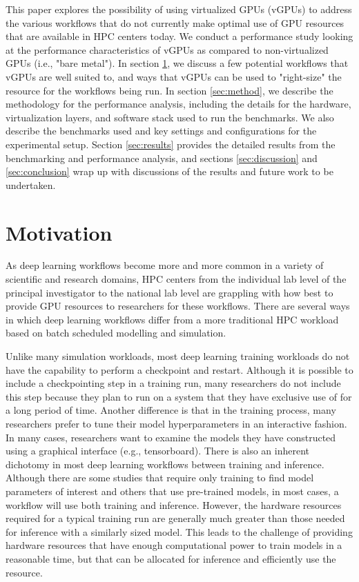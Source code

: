\documentclass[conference]{IEEEtran}
\begin{document}
This paper explores the possibility of using virtualized GPUs (vGPUs) to address the various workflows that do not currently make optimal use of GPU resources that are available in HPC centers today. We conduct a performance study looking at the performance characteristics of vGPUs as compared to non-virtualized GPUs (i.e., "bare metal"). In section \ref{sec:motive}, we discuss a few potential workflows that vGPUs are well suited to, and ways that vGPUs can be used to "right-size" the resource for the workflows being run. In section \ref{sec:method}, we describe the methodology for the performance analysis, including the details for the hardware, virtualization layers, and software stack used to run the benchmarks. We also describe the benchmarks used and key settings and configurations for the experimental setup. Section \ref{sec:results} provides the detailed results from the benchmarking and performance analysis, and sections \ref{sec:discussion} and \ref{sec:conclusion} wrap up with discussions of the results and future work to be undertaken.

\section{Motivation}\label{sec:motive}
As deep learning workflows become more and more common in a variety of scientific and research domains, HPC centers from the individual lab level of the principal investigator to the national lab level are grappling with how best to provide GPU resources to researchers for these workflows. There are several ways in which deep learning workflows differ from a more traditional HPC workload based on batch scheduled modelling and simulation. 

Unlike many simulation workloads, most deep learning training workloads do not have the capability to perform a checkpoint and restart. Although it is possible to include a checkpointing step in a training run, many researchers do not include this step because they plan to run on a system that they have exclusive use of for a long period of time. Another difference is that in the training process, many researchers prefer to tune their model hyperparameters in an interactive fashion. In many cases, researchers want to examine the models they have constructed using a graphical interface (e.g., tensorboard). There is also an inherent dichotomy in most deep learning workflows between training and inference. Although there are some studies that require only training to find model parameters of interest and others that use pre-trained models, in most cases, a workflow will use both training and inference. However, the hardware resources required for a typical training run are generally much greater than those needed for inference with a similarly sized model. This leads to the challenge of providing hardware resources that have enough computational power to train models in a reasonable time, but that can be allocated for inference and efficiently use the resource.  
\end{document}
